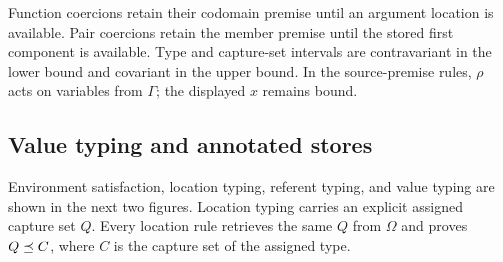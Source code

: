 \documentclass[acmsmall,screen,nonacm]{acmart}
\begin{document}
Function coercions retain their codomain premise until an argument location
is available.  Pair coercions retain the member premise until the stored
first component is available. Type and capture-set intervals are contravariant
in the lower bound and covariant in the upper bound. In the source-premise
rules, \(\rho\) acts on variables from \(\Gamma\); the displayed
\(x\) remains bound.

\subsection{Value typing and annotated stores}

Environment satisfaction, location typing, referent typing, and value typing
are shown in the next two figures. Location typing carries an explicit assigned
capture set \(Q\). Every location rule retrieves the same \(Q\) from
\(\Omega\) and proves \(Q\mathrel{\preceq} C\), where \(C\) is the capture set of the
assigned type.

\begingroup
\setlength{\abovedisplayskip}{5pt plus 1pt minus 1pt}
\setlength{\belowdisplayskip}{5pt plus 1pt minus 1pt}
\setlength{\intextsep}{5pt}
\captionsetup{skip=6pt}
\end{document}
